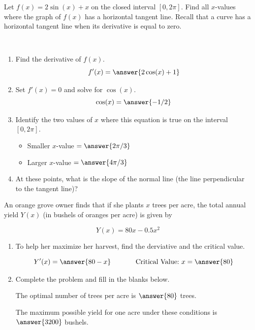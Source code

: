 \documentclass{ximera}
\begin{document}
\begin{problem}
Let $f(x) = 2\sin(x) + x$ on the closed interval $[0, 2\pi].$  Find all $x$-values where the graph of $f(x)$ has a horizontal 
tangent line.  Recall that a curve has a horizontal tangent line when its derivative is equal to zero. 

~ \\[1em]

\begin{enumerate}
    \item Find the derivative of $f(x).$
\[
f'(x) = \answer{2\cos(x) + 1}
\]

\item Set $f'(x) = 0$ and solve for $\cos(x).$
\[
\cos(x) = \answer{-1/2}
\]

\item Identify the two values of $x$ where this equation is true on the interval $[0, 2\pi].$  
\begin{itemize}
    \item Smaller $x$-value $= \answer{2\pi/3}$
    \item Larger $x$-value $= \answer{4\pi/3}$
\end{itemize}


\item At these points, what is the slope of the normal line (the line perpendicular to the tangent line)?

\begin{multipleChoice}
\end{multipleChoice}


\end{enumerate}

\end{problem}


\begin{problem}
An orange grove owner finds that if she plants $x$ trees per acre, the total annual yield $Y(x)$ (in bushels of oranges per acre) 
is given by

\[
Y(x) = 80x - 0.5x^2
\]

\begin{enumerate}
\item To help her maximize her harvest, find the derviative and the critical value.

\[
Y'(x) = \answer{80 - x}  \hspace{0.5in} \text{Critical Value:} \ x = \answer{80} 
\]

\item Complete the problem and fill in the blanks below.

\hspace{0.3in} The optimal number of trees per acre is $\answer{80}$ trees.

\hspace{0.3in} The maximum possible yield for one acre under these conditions is $\answer{3200}$ bushels.

\end{enumerate}
\end{problem}
\end{document}
